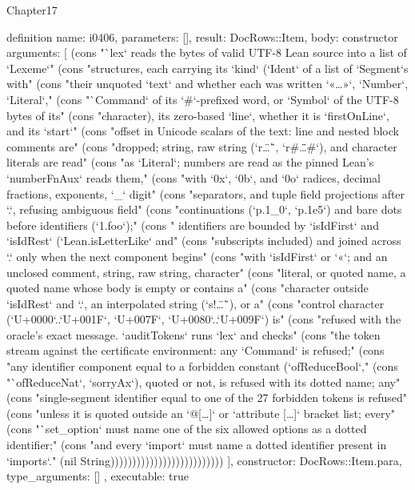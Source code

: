 \begin{lexlean}{Chapter17}
\begin{semanticmodule}
definition{
  name: i0406,
  parameters: [],
  result: DocRows::Item,
  body: constructor{
    arguments: [
      (cons "`lex` reads the bytes of valid UTF-8 Lean source into a list of `Lexeme`" (cons "structures, each carrying its `kind` (`Ident` of a list of `Segment`s with" (cons "their unquoted `text` and whether each was written `«…»`, `Number`, `Literal`," (cons "`Command` of its `#`-prefixed word, or `Symbol` of the UTF-8 bytes of its" (cons "character), its zero-based `line`, whether it is `firstOnLine`, and its `start`" (cons "offset in Unicode scalars of the text: line and nested block comments are" (cons "dropped; string, raw string (`r\"…\"`, `r#\"…\"#`), and character literals are read" (cons "as `Literal`; numbers are read as the pinned Lean's `numberFnAux` reads them," (cons "with `0x`, `0b`, and `0o` radices, decimal fractions, exponents, `_` digit" (cons "separators, and tuple field projections after `.`, refusing ambiguous field" (cons "continuations (`p.1_0`, `p.1e5`) and bare dots before identifiers (`1.foo`);" (cons " identifiers are bounded by `isIdFirst` and `isIdRest` (`Lean.isLetterLike` and" (cons "subscripts included) and joined across `.` only when the next component begins" (cons "with `isIdFirst` or `«`; and an unclosed comment, string, raw string, character" (cons "literal, or quoted name, a quoted name whose body is empty or contains a" (cons "character outside `isIdRest` and `.`, an interpolated string (`s!\"…\"`), or a" (cons "control character (`U+0000`..`U+001F`, `U+007F`, `U+0080`..`U+009F`) is" (cons "refused with the oracle's exact message. `auditTokens` runs `lex` and checks" (cons "the token stream against the certificate environment: any `Command` is refused;" (cons "any identifier component equal to a forbidden constant (`ofReduceBool`," (cons "`ofReduceNat`, `sorryAx`), quoted or not, is refused with its dotted name; any" (cons "single-segment identifier equal to one of the 27 forbidden tokens is refused" (cons "unless it is quoted outside an `@[…]` or `attribute […]` bracket list; every" (cons "`set_option` must name one of the six allowed options as a dotted identifier;" (cons "and every `import` must name a dotted identifier present in `imports`." (nil String))))))))))))))))))))))))))
    ],
    constructor: DocRows::Item.para,
    type_arguments: []
  },
  executable: true
}


\end{semanticmodule}
\end{lexlean}
